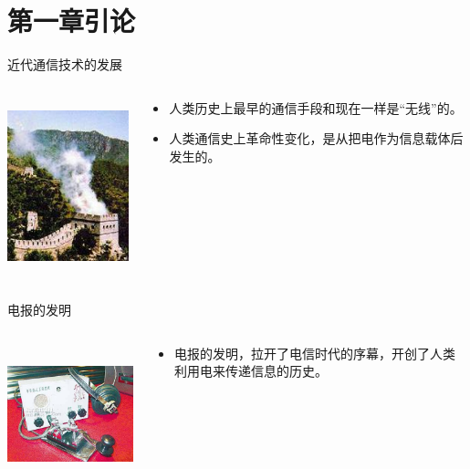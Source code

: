 \section{第一章\quad 引论}

\begin{frame}{近代通信技术的发展}
 \begin{columns}
  \begin{column}{0.35\linewidth}
   \centering
   \includegraphics[height=5cm]{fenghuotai2.jpg}
  \end{column}
  \begin{column}{0.65\linewidth}
   \centering
   \begin{itemize}
    \item 人类历史上最早的通信手段和现在一样是“无线”的。
    \item 人类通信史上革命性变化，是从把电作为信息载体后发生的。
   \end{itemize}
  \end{column}
 \end{columns}
\end{frame}

\begin{frame}{电报的发明}
 \begin{columns}
  \begin{column}{0.5\linewidth}
   \includegraphics[height=4cm]{dianbao}
  \end{column}
  \begin{column}{0.5\linewidth}
   \begin{itemize}
    \item 电报的发明，拉开了电信时代的序幕，开创了人类利用电来传递信息的历史。
   \end{itemize}
  \end{column}
 \end{columns}
\end{frame}

